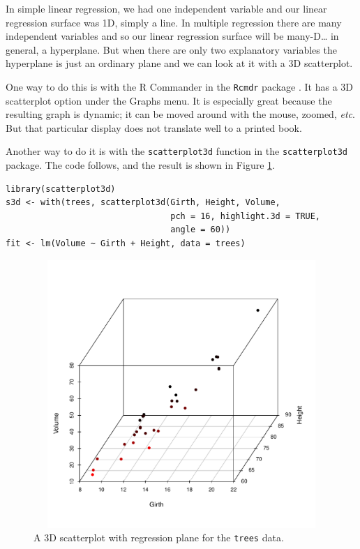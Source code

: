 \documentclass[captions=tableheading]{scrbook}
\begin{document}
In simple linear regression, we had one independent variable and our linear regression surface was 1D, simply a line. In multiple regression there are many independent variables and so our linear regression surface will be many-D\ldots{} in general, a hyperplane. But when there are only two explanatory variables the hyperplane is just an ordinary plane and we can look at it with a 3D scatterplot. 

One way to do this is with the \textsf{R} Commander in the \texttt{Rcmdr} package \cite{Foxrcmdr}. It has a 3D scatterplot option under the \textsf{Graphs} menu. It is especially great because the resulting graph is dynamic; it can be moved around with the mouse, zoomed, \emph{etc}. But that particular display does not translate well to a printed book.

Another way to do it is with the \texttt{scatterplot3d} function in the \texttt{scatterplot3d} package. The code follows, and the result is shown in Figure \ref{fig:3D-scatterplot-trees}.


\begin{verbatim}
library(scatterplot3d)
s3d <- with(trees, scatterplot3d(Girth, Height, Volume, 
                                 pch = 16, highlight.3d = TRUE, 
                                 angle = 60))
fit <- lm(Volume ~ Girth + Height, data = trees)
\end{verbatim}



\begin{figure}[ht!]
    \includegraphics[width=5in, height=4in]{img/3D-scatterplot-trees.pdf}
    \caption[3D scatterplot with regression plane for the \texttt{trees} data]{\small A 3D scatterplot with regression plane for the \texttt{trees} data.}
    \label{fig:3D-scatterplot-trees}
  \end{figure}
\end{document}

